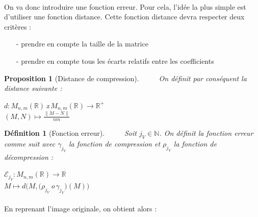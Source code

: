 \documentclass[a4paper,10pt]{report}
\theoremstyle{break}
\newtheorem{Def}{D\'{e}finition}
\newtheorem{Prop}{Proposition}
\begin{document}
    \paragraph{} On va donc introduire une fonction erreur. Pour cela, l'id\'{e}e la plus simple est d'utiliser une fonction distance.
	Cette fonction distance devra respecter deux crit\`{e}res :
	\begin{itemize}
	 \item [-] prendre en compte la taille de la matrice
	 \item [-] prendre en compte tous les \'{e}carts relatifs entre les coefficients
	\end{itemize}
    
\newpage
	
    \begin{Prop}[Distance de compression]
      $\phantom{Prop}$ On d\'{e}finit par cons\'{e}quent la distance suivante :
      \begin{center}
	$d : M_{n,m}(\mathbb{R}) \, $x$ \, M_{n,m}(\mathbb{R}) \longrightarrow \mathbb{R}^+ $ \\
	$ (M, N) \longmapsto \frac{\parallel M - N \parallel}{n m} $
      \end{center}

    \end{Prop}

    \begin{Def}[Fonction erreur]
      $\phantom{Prop}$ Soit $j_V \in \mathbb{N}$. On d\'{e}finit la fonction erreur comme suit avec $\gamma_{j_V}$ la fonction de compression 
	    et $\rho_{j_V}$ la fonction de d\'{e}compression :
      \begin{center}
	$\mathcal{E}_{j_V} : M_{n,m}(\mathbb{R}) \longrightarrow \mathbb{R}  $ \\
	$M \longmapsto d \Bigg(M, \Big(\rho_{j_V} \, $o$ \, \gamma_{j_V}\Big)(M) \Bigg)$
      \end{center}

    \end{Def}
    
    \paragraph{} En reprenant l'image originale, on obtient alors :
\end{document}

